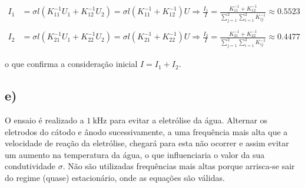 \documentclass[11pt, a4paper, titlepage, portuguese]{article}
\begin{document}
		\begin{align*}
				I_1 &= \sigma l \left(K^{-1}_{11}U_1 + K^{-1}_{12}U_2\right) = \sigma l \left(K^{-1}_{11} + K^{-1}_{12} \right)	U \Rightarrow \frac{I_1}{I} = \frac{K^{-1}_{11} + K^{-1}_{12}} {\sum\limits_{j=1}^{2} \sum\limits_{i=1}^{2} K^{-1}_{ij}}
				\approx 0.5523 \\ \\
				I_2 &= \sigma l \left(K^{-1}_{21}U_1 + K^{-1}_{22}U_2\right) = \sigma l \left(K^{-1}_{21} + K^{-1}_{22} \right)	U \Rightarrow \frac{I_2}{I} = \frac{K^{-1}_{21} + K^{-1}_{22}}{\sum\limits_{j=1}^{2} \sum\limits_{i=1}^{2} K^{-1}_{ij}}
				\approx 0.4477
		\end{align*}

		\par
		o que confirma a consideração inicial $I = I_1 + I_2$.

	\subsection{e)}
		\par
		O ensaio é realizado a $\SI{1}{\kilo\hertz}$ para evitar a eletrólise da água. Alternar os eletrodos do cátodo e ânodo sucessivamente, a uma frequência mais alta que a velocidade de reação da eletrólise, chegará para esta não ocorrer e assim evitar um aumento na temperatura da água, o que influenciaria o valor da sua condutividade $\sigma$. Não são utilizadas frequências mais altas porque arrisca-se sair do regime (quase) estacionário, onde as equações são válidas.
\end{document}
